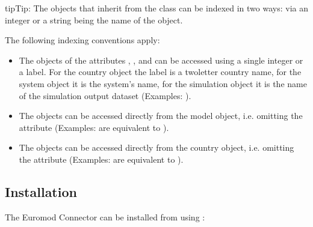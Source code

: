 \documentclass[letterpaper,10pt,english]{sphinxmanual}
\begin{document}
\begin{sphinxadmonition}{tip}{Tip:}
\sphinxAtStartPar
The objects that inherit from the  class can be indexed in two ways: via an integer or a string being the name of the object.
\end{sphinxadmonition}

\sphinxAtStartPar
The following indexing conventions apply:
\begin{itemize}
\item {} 
\sphinxAtStartPar
The objects of the attributes , , and  can be accessed using a single integer or a label. For the country object the label is a two\sphinxhyphen{}letter country name, for the system object it is the system’s name, for the simulation object it is the name of the simulation output dataset (Examples: ).

\item {} 
\sphinxAtStartPar
The  objects can be accessed directly from the model object, i.e. omitting the attribute  (Examples:  are equivalent to ).

\item {} 
\sphinxAtStartPar
The  objects can be accessed directly from the country object, i.e. omitting the attribute  (Examples:  are equivalent to ).

\end{itemize}


\subsection{Installation}
\label{\detokenize{notebooks/userguide:installation}}
\sphinxAtStartPar
The Euromod Connector can be installed from   using :
\end{document}
